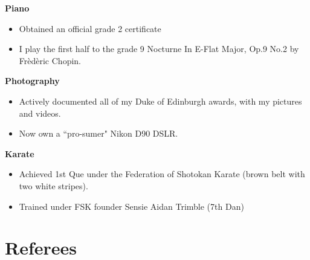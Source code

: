 \documentclass[margin,line]{resume}
\begin{document}
\begin{resume}
    \textbf{Piano}\vspace{-4mm}\\%
    \begin{itemize}
		\item Obtained an official grade 2 certificate
		\item I play the first half to the grade 9 Nocturne In E-Flat Major, Op.9 No.2 by Fr\`ed\`eric Chopin.
    \end{itemize}
    \vspace{-2mm}
    
    \textbf{Photography}\vspace{-4mm}\\%
    \begin{itemize}
    		\item Actively documented all of my Duke of Edinburgh awards, with my pictures and videos.
		\item Now own a ``pro-sumer" Nikon D90 DSLR.
    \end{itemize}
    \vspace{-2mm}
    
    \textbf{Karate}\vspace{-4mm}\\%
    \begin{itemize}
    		\item Achieved 1st Que under the Federation of Shotokan Karate (brown belt with two white stripes).
		\item Trained under FSK founder Sensie Aidan Trimble (7th Dan)
    \end{itemize}
    





\section{\mysidestyle Referees} 


\end{resume}
\end{document}
